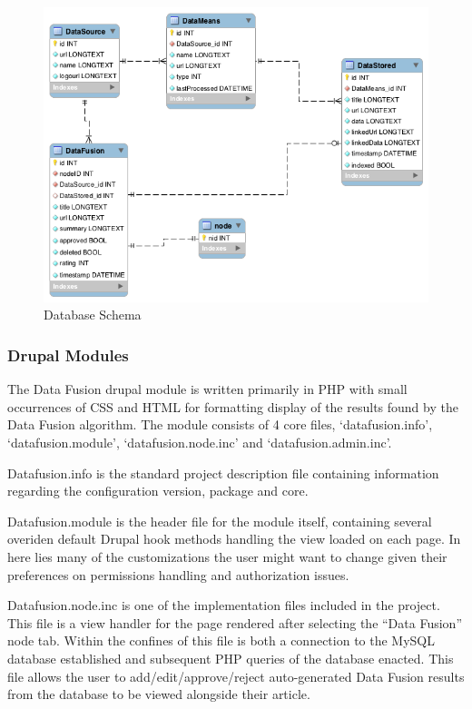 \documentclass[11pt]{article} %
\begin{document}
\begin{figure}[htbp]
\begin{center}
\includegraphics[width=\columnwidth]{images/database_schema}
\caption{Database Schema}
\end{center}
\end{figure}

\subsubsection{Drupal Modules}

The Data Fusion drupal module is written primarily in PHP with small occurrences of CSS and HTML for formatting display of the results found by the Data Fusion algorithm. The module consists of 4 core files, ‘datafusion.info’,  ‘datafusion.module’, ‘datafusion.node.inc’ and ‘datafusion.admin.inc’.

Datafusion.info is the standard project description file containing information regarding the configuration version, package and core.

Datafusion.module is the header file for the module itself, containing several overiden default Drupal hook methods handling the view loaded on each page. In here lies many of the customizations the user might want to change given their preferences on permissions handling and authorization issues.

Datafusion.node.inc is one of the implementation files included in the project.  This file is a view handler for the page rendered after selecting the “Data Fusion” node tab. Within the confines of this file is both a connection to the MySQL database established and subsequent PHP queries of the database enacted. This file allows the user to add/edit/approve/reject auto-generated Data Fusion results from the database to be viewed alongside their article.
\end{document}
